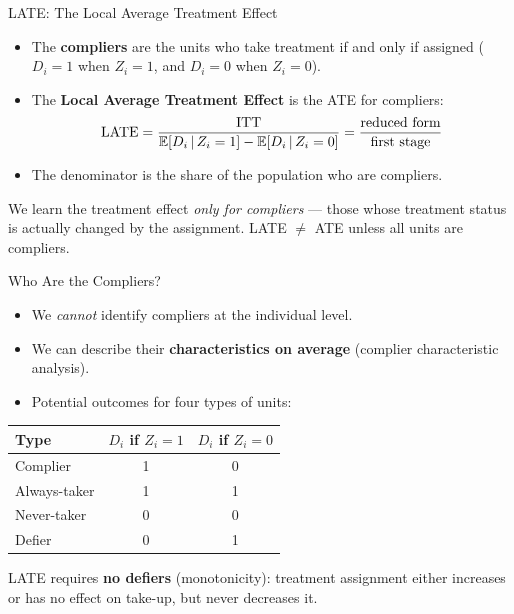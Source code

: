 \documentclass[aspectratio=169, 11pt]{beamer}
\begin{document}
\begin{frame}[t]{LATE: The Local Average Treatment Effect}
\begin{itemize}
  \setlength\itemsep{0.5em}
  \item The \textbf{compliers} are the units who take treatment if and only if assigned
        ($D_i = 1$ when $Z_i = 1$, and $D_i = 0$ when $Z_i = 0$).
  \item The \textbf{Local Average Treatment Effect} is the ATE for compliers:
  \[
    \mathrm{LATE} = \frac{\mathrm{ITT}}{\mathbb{E}\!\left[D_i\,\middle|\,Z_i=1\right] - \mathbb{E}\!\left[D_i\,\middle|\,Z_i=0\right]}
          = \frac{\text{reduced form}}{\text{first stage}}
  \]
  \item The denominator is the share of the population who are compliers.
\end{itemize}
\vspace{0.3em}
\begin{keybox}
We learn the treatment effect \emph{only for compliers} — those whose treatment
status is actually changed by the assignment. LATE $\neq$ ATE unless all
units are compliers.
\end{keybox}
\end{frame}

\begin{frame}[t]{Who Are the Compliers?}
\begin{itemize}
  \setlength\itemsep{0.5em}
  \item We \emph{cannot} identify compliers at the individual level.
  \item We can describe their \textbf{characteristics on average}
        (complier characteristic analysis).
  \item Potential outcomes for four types of units:
\end{itemize}
\vspace{0.3em}
\begin{center}
\footnotesize
\begin{tabular}{lcc}
\toprule
\textbf{Type} & \textbf{$D_i$ if $Z_i=1$} & \textbf{$D_i$ if $Z_i=0$} \\
\midrule
Complier & 1 & 0 \\
Always-taker & 1 & 1 \\
Never-taker & 0 & 0 \\
Defier & 0 & 1 \\
\bottomrule
\end{tabular}
\end{center}
\vspace{0.4em}
\begin{warningbox}
LATE requires \textbf{no defiers} (monotonicity): treatment assignment either
increases or has no effect on take-up, but never decreases it.
\end{warningbox}
\end{frame}
\end{document}
